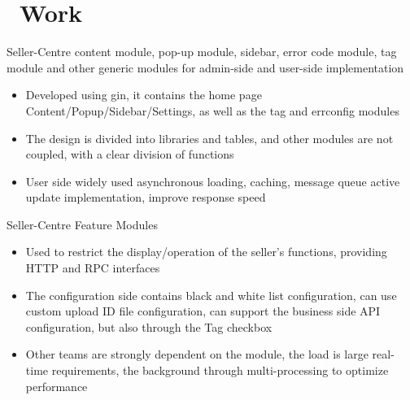 \documentclass{resume}
\newcommand{\en}[1]{#1}
\newcommand{\zh}[1]{}
\begin{document}
\section{\faGithubAlt\ \en{Work}\zh{工作项目}}
\en{Seller-Centre content module, pop-up module, sidebar, error code module, tag module and other generic modules for admin-side and user-side implementation}
\zh{Seller-Centre 内容模块、弹窗模块、侧边栏、错误码模块、标签模块以及其它通用模块的 admin 端和 user 端实现}
\begin{itemize}
      \item \en{Developed using gin, it contains the home page Content/Popup/Sidebar/Settings, as well as the tag and errconfig modules}
            \zh{使用 gin 开发,包含首页 Content/Popup/Sidebar/Settings,以及 tag、errconfig 模块}
      \item \en{The design is divided into libraries and tables, and other modules are not coupled, with a clear division of functions}
            \zh{设计上分库分表,与其它模块不耦合,功能划分清晰}
      \item \en{User side widely used asynchronous loading, caching, message queue active update implementation, improve response speed}
            \zh{user 端广泛使用异步加载、缓存、消息队列主动更新实现,提高响应速度}
\end{itemize}

\en{Seller-Centre Feature Modules}
\zh{Seller-Centre Feature 模块}
\begin{itemize}
      \item \en{Used to restrict the display/operation of the seller's functions, providing HTTP and RPC interfaces}
            \zh{用于限制卖家的功能显示/操作,提供 HTTP 以及 RPC 接口}
      \item \en{The configuration side contains black and white list configuration, can use custom upload ID file configuration, can support the business side API configuration, but also through the Tag checkbox}
            \zh{配置端包含黑白名单配置,可使用自定义上传 ID 文件方式配置,可以支持通过业务方 API 方式配置,也可通过 Tag 勾选}
      \item \en{Other teams are strongly dependent on the module, the load is large real-time requirements, the background through multi-processing to optimize performance}
            \zh{其它团队强依赖模块,负载大实时性要求强,后台通过多协程处理优化性能}
\end{itemize}
\end{document}
